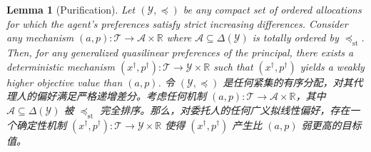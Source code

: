 \documentclass[12pt,letterpaper]{article}
\newenvironment{original}{\color{black}\noindent}{}
\newenvironment{translation}{\color{blue}\noindent}{}
\theoremstyle{plain}
\newtheorem{lemma}{Lemma}
\theoremstyle{definition}
\theoremstyle{remark}
\newcommand{\R}{\mathds{R}}
\newcommand{\Y}{\mathcal{Y}}
\renewcommand{\1}{\mathds{1}}
\theoremstyle{definition}
\begin{document}
\begin{lemma}[Purification]\label{lem:purification}
\begin{original}
Let $(\Y, \preceq)$ be any compact set of ordered allocations for which the agent's preferences satisfy strict increasing differences. Consider any mechanism $(a, p): \mathcal{T}\rightarrow \mathcal{A} \times \R$ where $\mathcal{A} \subseteq \Delta(\Y)$ is totally ordered by $\preceq_{\text{st}}$. Then, for any generalized quasilinear preferences of the principal, there exists a deterministic mechanism $(x^\dagger, p^\dagger): \mathcal{T} \rightarrow \Y \times \R$ such that $(x^\dagger, p^\dagger)$ yields a weakly higher objective value than $(a, p)$.
\end{original}
\begin{translation}
令 $(\Y, \preceq)$ 是任何紧集的有序分配，对其代理人的偏好满足严格递增差分。考虑任何机制 $(a, p): \mathcal{T}\rightarrow \mathcal{A} \times \R$，其中 $\mathcal{A} \subseteq \Delta(\Y)$ 被 $\preceq_{\text{st}}$ 完全排序。那么，对委托人的任何广义拟线性偏好，存在一个确定性机制 $(x^\dagger, p^\dagger): \mathcal{T} \rightarrow \Y \times \R$ 使得 $(x^\dagger, p^\dagger)$ 产生比 $(a, p)$ 弱更高的目标值。
\end{translation}
\end{lemma}
\end{document}
